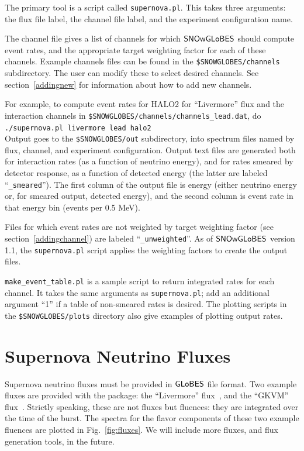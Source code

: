 \documentclass[12pt]{article}
\newcommand{\globes}{\sf{GLoBES}}
\newcommand{\snowglobes}{\sf{SNOwGLoBES}}
\begin{document}
The primary tool is a script called \texttt{supernova.pl}.  This takes three arguments: the flux file label, the channel file label, and the experiment configuration name.

The channel file gives a list of channels for which $\snowglobes$
should compute event rates, and the appropriate target weighting
factor for each of these channels.  Example channels files can be
found in the \texttt{\$SNOWGLOBES/channels} subdirectory.  The user can
modify these to select desired channels.  See section~\ref{addingnew}
for information about how to add new channels.

For example, to compute event rates for HALO2 for ``Livermore'' flux and  the interaction channels in
\texttt{\$SNOWGLOBES/channels/channels\_lead.dat}, do\\

\texttt{./supernova.pl livermore lead halo2} \\

Output goes to the \texttt{\$SNOWGLOBES/out} subdirectory, into spectrum files
named by flux, channel, and experiment configuration.  Output text
files are generated both for interaction rates (as a function of
neutrino energy), and for rates smeared by detector response, as a
function of detected energy (the latter are labeled ``\texttt{\_smeared}'').  The
first column of the output file is energy (either neutrino energy or,
for smeared output, detected energy), and the second column is event
rate in that energy bin (events per 0.5 MeV).

Files for which event rates are not weighted by target weighting factor (see section~\ref{addingchannel}) are labeled ``\texttt{\_unweighted}''.  As of 
$\snowglobes$ version 1.1, the \texttt{supernova.pl} script applies the weighting factors to create the output files.

\texttt{make\_event\_table.pl} is a sample script to return integrated
rates for each channel.   It takes the same arguments as \texttt{supernova.pl}; add an additional argument ``1'' if a table of non-smeared rates is desired.
The
plotting scripts in the \texttt{\$SNOWGLOBES/plots} directory also
give examples of plotting output rates. 

\section{Supernova Neutrino Fluxes}

Supernova neutrino fluxes must be provided in $\globes$ file format.  Two
example fluxes are provided with the package: the ``Livermore''
flux~\cite{Totani:1997vj}, and the ``GKVM'' flux~\cite{Gava:2009pj}.
Strictly speaking, these are not fluxes but fluences: they are
integrated over the time of the burst.  The spectra for the flavor
components of these two example fluences are plotted in
Fig.~\ref{fig:fluxes}.  We will include more fluxes, and flux generation tools, in the future.
\end{document}
